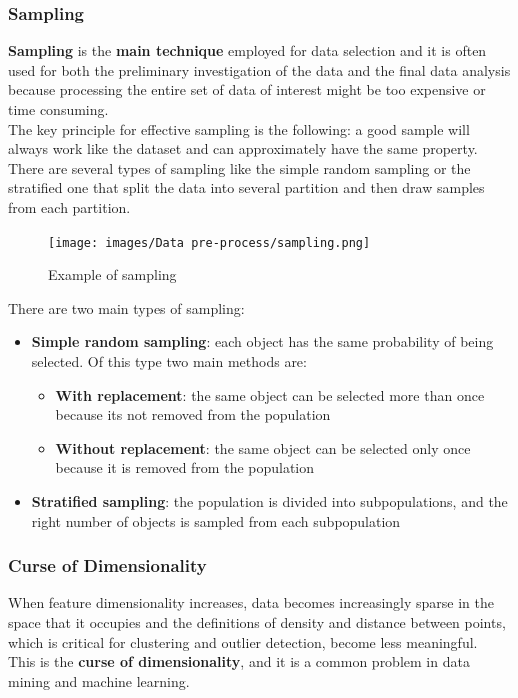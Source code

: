 \subsubsection{Sampling}
\textbf{Sampling} is the \textbf{main technique} employed for data selection
and it is often used for both the preliminary investigation of the
data and the final data analysis because processing the entire set of
data of interest might be too expensive or time consuming.\\
The key principle for effective sampling is the following: a good
sample will always work like the dataset and can approximately have
the same property.\\
There are several types of sampling like the simple random sampling or
the stratified one that split the data into several partition and then
draw samples from each partition.

\begin{figure}[H]
  \centering
  \texttt{[image: images/Data
  pre-process/sampling.png]}
  \caption{Example of sampling}
  \label{fig:sampling}
\end{figure}
There are two main types of sampling:
\begin{itemize}
  \item \textbf{Simple random sampling}: each object has the same probability
    of being selected. Of this type two main methods are: 
    \begin{itemize}
      \item \textbf{With replacement}: the same object can be selected
        more than once because its not removed from the population
      \item \textbf{Without replacement}: the same object can be selected
        only once because it is removed from the population
    \end{itemize}
  \item \textbf{Stratified sampling}: the population is divided into
    subpopulations, and the right number of objects is sampled from
    each subpopulation
\end{itemize}

\subsubsection{Curse of Dimensionality}
When feature dimensionality increases, data becomes increasingly
sparse in the space that it occupies and the definitions of density
and distance between points, which is critical for clustering and
outlier detection, become less meaningful.\\
This is the \textbf{curse of dimensionality}, and it is a common 
problem in data mining and machine learning.
